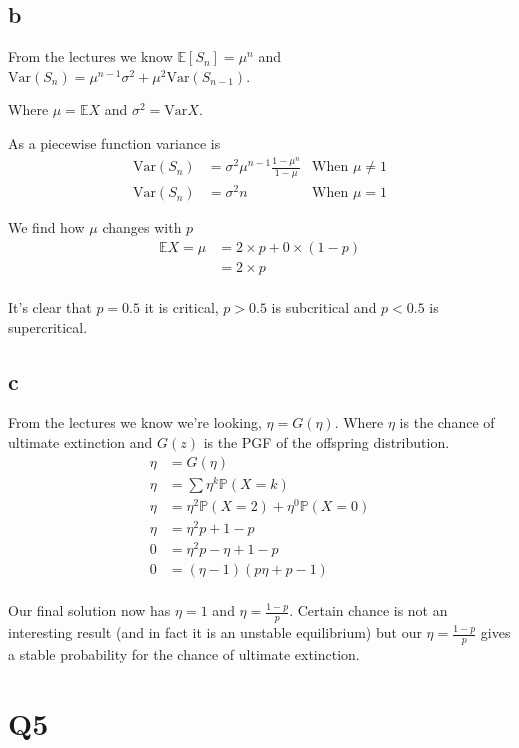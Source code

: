 \documentclass{article}
\newcommand{\prob}{\mathbb{P}}
\newcommand{\expect}{\mathbb{E}}
\newcommand{\var}{\text{Var}}
\begin{document}
\subsection{b}
From the lectures we know $\expect[S_n] = \mu^n$ and
$\var(S_n) = \mu^{n-1} \sigma^2 + \mu^2 \var(S_{n-1})$.

Where $\mu = \expect X$ and $\sigma^2 = \var X$.

As a piecewise function variance is
\begin{align*}
    \var(S_n) &= \sigma^2 \mu^{n-1} \frac{1-\mu^n}{1-\mu}
    & \text{When $\mu \neq 1$} \\
    \var(S_n) &= \sigma^2 n
    & \text{When $\mu = 1$}
\end{align*}

We find how $\mu$ changes with $p$
\begin{align*}
    \expect X = \mu &= 2 \times p + 0 \times (1 - p) \\
    &= 2 \times p \\
\end{align*}

It's clear that $p = 0.5$ it is critical, $p > 0.5$ is subcritical and
$p < 0.5$ is supercritical.

\subsection{c}
From the lectures we know we're looking, $\eta = G(\eta)$. Where $\eta$ is
the chance of ultimate extinction and $G(z)$ is the PGF of the offspring
distribution.
\begin{align*}
    \eta &= G(\eta) \\
    \eta &= \sum \eta^k \prob(X=k) \\
    \eta &= \eta^2 \prob(X=2) + \eta^0 \prob(X=0) \\
    \eta &= \eta^2 p + 1 - p \\
    0 &= \eta^2 p - \eta + 1 - p \\
    0 &= (\eta - 1)(p \eta + p - 1)  \\
\end{align*}

Our final solution now has $\eta = 1$ and $\eta = \frac{1-p}{p}$.
Certain chance is not an interesting result (and in fact it is an unstable
equilibrium) but our $\eta = \frac{1-p}{p}$ gives a stable probability
for the chance of ultimate extinction.

\section{Q5}
\end{document}
